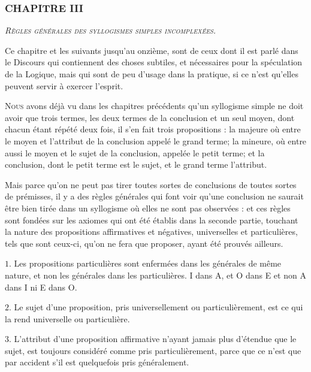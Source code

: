 \subsubsection{\centering \Large CHAPITRE III}
\begin{center}\emph{\large\scshape Règles générales des syllogismes simples incomplexées.}\end{center}

	\begin{center}{\footnotesize Ce chapitre et les suivants jusqu'au onzième, sont de ceux dont il est parlé dans le Discours qui contiennent des choses subtiles, et nécessaires pour la spéculation de la Logique, mais qui sont de peu d'usage dans la pratique, si ce n'est qu'elles peuvent servir à exercer l'esprit.}\end{center}

		\lettrine{N}{ous} avons déjà vu dans les chapitres précédents qu'un syllogisme simple ne doit avoir que trois termes, les deux termes de la conclusion et un seul moyen, dont chacun étant répété deux fois, il s'en fait trois propositions : la majeure où entre le moyen et l'attribut de la conclusion appelé le grand terme; la mineure, où entre aussi le moyen et le sujet de la conclusion, appelée le petit terme; et la conclusion, dont le petit terme est le sujet, et le grand terme l'attribut.

Mais parce qu'on ne peut pas tirer toutes sortes de conclusions de toutes sortes de prémisses, il y a des règles générales qui font voir qu'une conclusion ne saurait être bien tirée dans un syllogisme où elles ne sont pas observées : et ces règles sont fondées sur les axiomes qui ont été établis dans la seconde partie, touchant la nature des propositions affirmatives et négatives, universelles et particulières, tels que sont ceux-ci, qu'on ne fera que proposer, ayant été prouvés ailleurs.

\smallbreak
$1$. Les propositions particulières sont enfermées dans les générales de même nature, et non les générales dans les particulières. I dans A, et O dans E et non A dans I ni E dans O.

\smallbreak
$2$. Le sujet d'une proposition, pris universellement ou particulièrement, est ce qui la rend universelle ou particulière.

\smallbreak
$3$. L'attribut d'une proposition affirmative n'ayant jamais plus d'étendue que le sujet, est toujours considéré comme pris particulièrement, parce que ce n'est que par accident s'il est quelquefois pris généralement.

